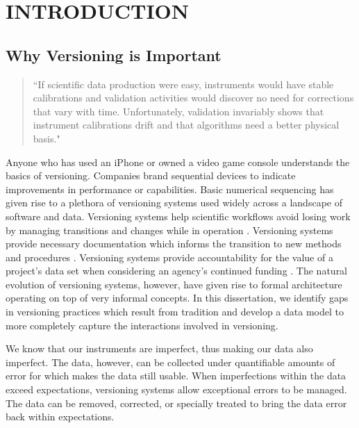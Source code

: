 
\chapter{INTRODUCTION}

\section{Why Versioning is Important}

\begin{quotation}
	``If scientific data production were easy, instruments would
	have stable calibrations and validation activities would discover no need for
	corrections that vary with time. Unfortunately, validation invariably shows that
	instrument calibrations drift and that algorithms need a better physical basis." \cite{Barkstrom2003}
\end{quotation}

Anyone who has used an iPhone or owned a video game console understands the basics of versioning.
Companies brand sequential devices to indicate improvements in performance or capabilities.
Basic numerical sequencing has given rise to a plethora of versioning systems used widely across a landscape of software and data.
Versioning systems help scientific workflows avoid losing work by managing transitions and changes while in operation \cite{Casati1996}.
Versioning systems provide necessary documentation which informs the transition to new methods and procedures \cite{Wiil:2000:RDH:338407.338517}.
Versioning systems provide accountability for the value of a project's data set when considering an agency's continued funding \cite{Cavanaugh2002}.
The natural evolution of versioning systems, however, have given rise to formal architecture operating on top of very informal concepts.
In this dissertation, we identify gaps in versioning practices which result from tradition and develop a data model to more completely capture the interactions involved in versioning.

We know that our instruments are imperfect, thus making our data also imperfect.
The data, however, can be collected under quantifiable amounts of error for which makes the data still usable.
When imperfections within the data exceed expectations, versioning systems allow exceptional errors to be managed.
The data can be removed, corrected, or specially treated to bring the data error back within expectations.

